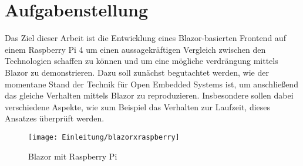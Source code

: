 \section{Aufgabenstellung}
\label{sec:aufgabenstellung}
Das Ziel dieser Arbeit ist die Entwicklung eines Blazor-basierten Frontend auf einem Raspberry Pi
4 um einen aussagekräftigen Vergleich zwischen den Technologien schaffen zu können und um eine
mögliche verdrängung mittels Blazor zu demonstrieren. Dazu soll
zunächst begutachtet werden, wie der momentane Stand der Technik für Open Embedded Systems ist,
um anschließend das gleiche Verhalten mittels Blazor zu reproduzieren. Insbesondere sollen dabei
verschiedene Aspekte, wie zum Beispiel das Verhalten zur Laufzeit, dieses Ansatzes überprüft werden.
\begin{figure}[h]
    \centering
    \texttt{[image: Einleitung/blazorxraspberry]}
    \caption[Blazor mit Raspberry Pi]{Blazor mit Raspberry Pi}
    \label{img:blazorxraspberry}
\end{figure}